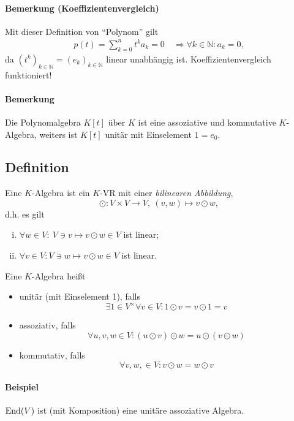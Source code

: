 \paragraph{Bemerkung (Koeffizientenvergleich)}
	Mit dieser Definition von "`Polynom"' gilt
		\begin{align*}
			p(t)=\sum_{k=0}^{n}t^ka_k = 0
			\quad\Rightarrow \forall k\in \mathbb{N}: a_k = 0,
		\end{align*}
	da $ (t^k)_{k\in \mathbb{N}} = (e_k)_{k\in \mathbb{N}}$ linear unabhängig ist.
	Koeffizientenvergleich funktioniert!
\paragraph{Bemerkung}
	Die Polynomalgebra $ K[t] $ über $ K $ ist eine assoziative und kommutative $ K $-Algebra, weiters ist $ K[t] $ unitär mit Einselement $ 1=e_0 $.
\subsection{Definition}
	\begin{Definition}[Algebra]
		Eine $ K $-Algebra ist ein $ K $-VR mit einer \emph{bilinearen Abbildung},
		\[ \odot: V\times V \to V,\ (v,w)\mapsto v\odot w, \]
	d.h. es gilt
		\begin{enumerate}[(i)]
			\item $ \forall w\in V:\ V\ni v\mapsto v\odot w\in V $ ist linear;
			\item $ \forall v\in V: V\ni w\mapsto v\odot w\in V $ ist linear.
		\end{enumerate}
	
	Eine $ K $-Algebra heißt
		\begin{itemize}
			\item unitär (mit Einselement 1), falls
                              \[\exists 1\in V^\times\forall v\in V: 1\odot v = v\odot 1 = v\]
			\item assoziativ, falls
                              \[\forall u,v,w\in V: (u\odot v)\odot w = u\odot (v\odot w)\]
			\item kommutativ, falls
                              \[\forall v,w,\in V: v\odot w = w\odot v\]
		\end{itemize}
	\end{Definition}
\paragraph{Beispiel}
	$ \operatorname{End}(V) $ ist (mit Komposition) eine unitäre assoziative Algebra.
